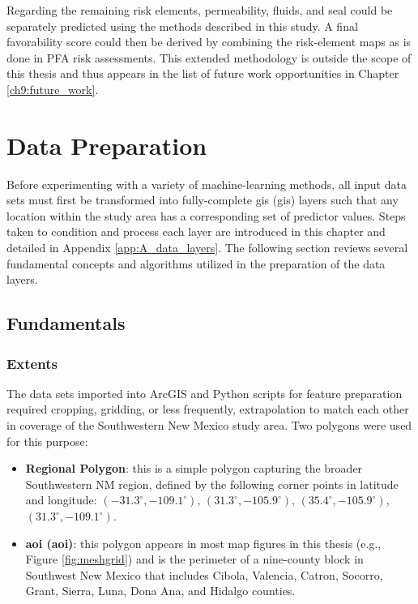 Regarding the remaining risk elements, permeability, fluids, and seal could be separately predicted using the methods described in this study. A final favorability score could then be derived by combining the risk-element maps as is done in PFA risk assessments. This extended methodology is outside the scope of this thesis and thus appears in the list of future work opportunities in Chapter \ref{ch9:future_work}.

\section{Data Preparation}\label{ch3:data_prep}
Before experimenting with a variety of machine-learning methods, all input data sets must first be transformed into fully-complete \acrlong{gis} (\acrshort{gis}) layers such that any location within the study area has a corresponding set of predictor values. Steps taken to condition and process each layer are introduced in this chapter and detailed in Appendix \ref{app:A_data_layers}. The following section reviews several fundamental concepts and algorithms utilized in the preparation of the data layers.

\subsection{Fundamentals}\label{ch3:data_prep_fundamentals}
\subsubsection{Extents}\label{ch3:extents}
The data sets imported into ArcGIS and Python scripts for feature preparation required cropping, gridding, or less frequently, extrapolation to match each other in coverage of the Southwestern New Mexico study area. Two polygons were used for this purpose:

\begin{itemize}
\item \textbf{Regional Polygon}: this is a simple polygon capturing the broader Southwestern NM region, defined by the following corner points in latitude and longitude: $(-31.3^\circ, -109.1^\circ)$, $(31.3^\circ, -105.9^\circ)$, $(35.4^\circ, -105.9^\circ)$, $(31.3^\circ, -109.1^\circ)$.

\item \textbf{\acrlong{aoi} (\acrshort{aoi})}: this polygon appears in most map figures in this thesis (e.g., Figure \ref{fig:meshgrid}) and is the perimeter of a nine-county block in Southwest New Mexico that includes Cibola, Valencia, Catron, Socorro, Grant, Sierra, Luna, Dona Ana, and Hidalgo counties.
\end{itemize}

